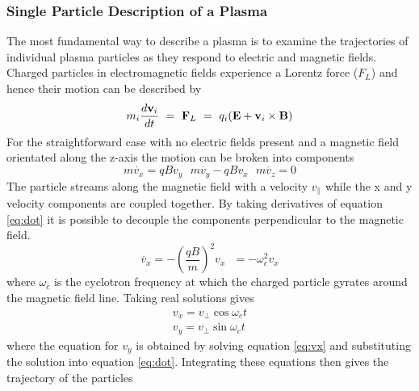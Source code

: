 \subsubsection{Single Particle Description of a Plasma}
The most fundamental way to describe a plasma is to examine the trajectories of individual plasma particles as they respond to electric and magnetic fields. Charged particles in electromagnetic fields experience a Lorentz force ($F_L$) and hence their motion can be described by
\begin{equation}
m_i \frac{d \bold{v}_i}{dt} \  = \ \bold{F}_L \ = \ q_i (\bold{E} + \bold{v}_i \times \bold{B})
\label{eq:force}
\end{equation}
For the straightforward case with no electric fields present and a magnetic field orientated along the z-axis the motion can be broken into components
\begin{equation}
m \dot{v_x} = q B v_y \ \ \ m \dot{v_y} - q B v_x \ \ \ m \dot{v_z} = 0
\label{eq:dot}
\end{equation}
The particle streams along the magnetic field with a velocity $ v_{\parallel} $ while the x and y velocity components are coupled together. By taking derivatives of equation \ref{eq:dot} it is possible to decouple the components perpendicular to the magnetic field. 
\begin{equation}
\ddot{v_x}  =   - {\left(\frac{qB}{m}\right)}^2 v_x  \ \ \   =   - \omega_c^2 v_x  
\label{eq:vx}
\end{equation}
where $\omega_c$ is the cyclotron frequency at which the charged particle gyrates around the magnetic field line. Taking real solutions gives
\begin{equation}
\begin{split}
v_x = v_\perp \cos\omega_c t  \\
v_y = v_\perp \sin\omega_c t
\end{split}
\end{equation}
where the equation for $v_y$ is obtained by solving equation \ref{eq:vx} and substituting the solution into equation \ref{eq:dot}. Integrating these equations then gives the trajectory of the particles 

